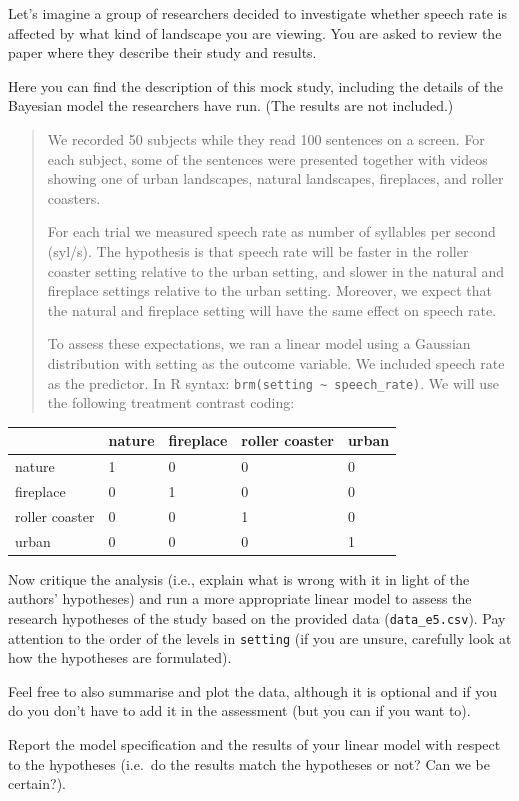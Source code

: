 \documentclass[
]{article}
\begin{document}
Let's imagine a group of researchers decided to investigate whether
speech rate is affected by what kind of landscape you are viewing. You
are asked to review the paper where they describe their study and
results.

Here you can find the description of this mock study, including the
details of the Bayesian model the researchers have run. (The results are
not included.)

\begin{quote}
We recorded 50 subjects while they read 100 sentences on a screen. For
each subject, some of the sentences were presented together with videos
showing one of urban landscapes, natural landscapes, fireplaces, and
roller coasters.

For each trial we measured speech rate as number of syllables per second
(syl/s). The hypothesis is that speech rate will be faster in the roller
coaster setting relative to the urban setting, and slower in the natural
and fireplace settings relative to the urban setting. Moreover, we
expect that the natural and fireplace setting will have the same effect
on speech rate.

To assess these expectations, we ran a linear model using a Gaussian
distribution with setting as the outcome variable. We included speech
rate as the predictor. In R syntax:
\texttt{brm(setting\ \textasciitilde{}\ speech\_rate)}. We will use the
following treatment contrast coding:
\end{quote}

\begin{longtable}[]{@{}lllll@{}}
\toprule\noalign{}
& nature & fireplace & roller coaster & urban \\
\midrule\noalign{}
\endhead
\bottomrule\noalign{}
\endlastfoot
nature & 1 & 0 & 0 & 0 \\
fireplace & 0 & 1 & 0 & 0 \\
roller coaster & 0 & 0 & 1 & 0 \\
urban & 0 & 0 & 0 & 1 \\
\end{longtable}

Now critique the analysis (i.e., explain what is wrong with it in light
of the authors' hypotheses) and run a more appropriate linear model to
assess the research hypotheses of the study based on the provided data
(\texttt{data\_e5.csv}). Pay attention to the order of the levels in
\texttt{setting} (if you are unsure, carefully look at how the
hypotheses are formulated).

Feel free to also summarise and plot the data, although it is optional
and if you do you don't have to add it in the assessment (but you can if
you want to).

Report the model specification and the results of your linear model with
respect to the hypotheses (i.e.~do the results match the hypotheses or
not? Can we be certain?).
\end{document}
